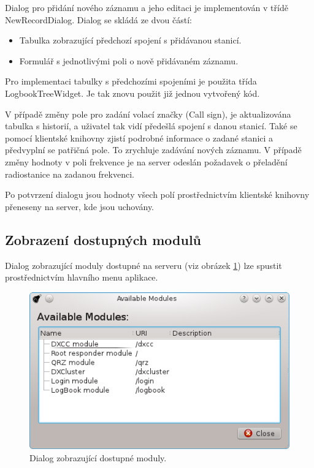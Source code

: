Dialog pro přidání nového záznamu a jeho editaci je implementován v třídě NewRecordDialog. Dialog se skládá ze dvou částí:

\begin{itemize}
\item Tabulka zobrazující předchozí spojení s přidávanou stanicí.
\item Formulář s jednotlivými poli o nově přidávaném záznamu.
\end{itemize}

Pro implementaci tabulky s předchozími spojeními je použita třída
LogbookTreeWidget. Je tak znovu použit již jednou vytvořený
kód.

V případě změny pole pro zadání volací značky (Call sign), je aktualizována tabulka s historií, a uživatel tak vidí předešlá 
spojení s danou stanicí. Také se pomocí klientské knihovny zjistí podrobné informace o zadané stanici a předvyplní se patřičná
pole. To zrychluje zadávání nových záznamu. V případě změny hodnoty v poli frekvence je na server odeslán požadavek o přeladění
radiostanice na zadanou frekvenci.

Po potvrzení dialogu jsou hodnoty všech polí prostřednictvím klientské knihovny přeneseny na server, kde jsou uchovány.

\subsection{Zobrazení dostupných modulů}

Dialog zobrazující moduly dostupné na serveru (viz obrázek \ref{fig:moduly_dialog}) lze spustit prostřednictvím hlavního menu aplikace.

\begin{figure}[h]
\centering
\includegraphics[trim=0cm 0cm 0cm 0cm, scale=1]{fig/ham6}
\caption{Dialog zobrazující dostupné moduly.}
\label{fig:moduly_dialog}
\end{figure}

